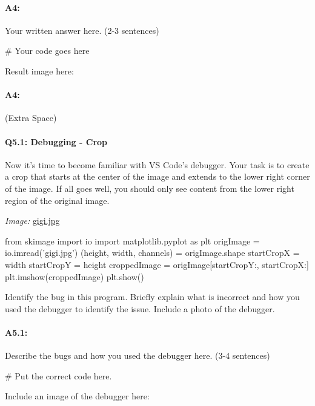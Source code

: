 \documentclass[11pt]{article}
\begin{document}
\paragraph{A4:} Your written answer here. (2-3 sentences)
\begin{python}
# Your code goes here
\end{python}

Result image here:
\pagebreak
\paragraph{A4:} (Extra Space)




\pagebreak
\paragraph{Q5.1: Debugging - Crop} Now it's time to become familiar with VS Code's debugger. Your task is to create a crop that starts at the center of the image and extends to the lower right corner of the image. If all goes well, you should only see content from the lower right region of the original image.


\emph{Image:} \href{gigi.jpg}{gigi.jpg}

\begin{python}
from skimage import io
import matplotlib.pyplot as plt
origImage = io.imread('gigi.jpg')
(height, width, channels) = origImage.shape
startCropX = width %
startCropY = height %
croppedImage = origImage[startCropY:, startCropX:]
plt.imshow(croppedImage)
plt.show()
\end{python}
Identify the bug in this program. Briefly explain what is incorrect and how you used the debugger to identify the issue. Include a photo of the debugger.

\paragraph{A5.1: } Describe the bugs and how you used the debugger here. (3-4 sentences)
\begin{python}
# Put the correct code here.
\end{python}

Include an image of the debugger here:
\end{document}
